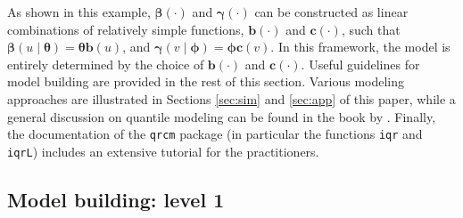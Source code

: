 \documentclass[12pt]{article}
\def\thetavec{\bm{\theta}}
\def\phivec{\bm{\phi}}
\def\betavec{\bm{\beta}}
\def\gammavec{\bm{\gamma}}
\def\bvec{\bm{b}}
\def\cvec{\bm{c}}
\begin{document}
As shown in this example, $\betavec(\cdot)$ and $\gammavec(\cdot)$ can be constructed as linear combinations of relatively
simple functions, $\bvec(\cdot)$ and $\cvec(\cdot)$, such that $\betavec(u\mid\thetavec) = \thetavec\bvec(u)$, and $\gammavec(v\mid\phivec) = \phivec\cvec(v)$.
In this framework, the model is entirely determined by the choice of $\bvec(\cdot)$ and $\cvec(\cdot)$.
Useful guidelines for model building are provided in the rest of this section.
Various modeling approaches are illustrated in Sections \ref{sec:sim} and \ref{sec:app} of this paper,
while a general discussion on quantile modeling can be found in the book by \cite{gil}.
Finally, the documentation of the \texttt{qrcm} package (in particular the functions
\texttt{iqr} and \texttt{iqrL}) includes an extensive tutorial for the practitioners.

\subsection{Model building: level 1}\label{subsec:level1}
\end{document}
